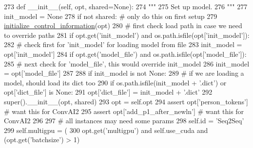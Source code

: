 \begin{DoxyCode}
273     \textcolor{keyword}{def }\_\_init\_\_(self, opt, shared=None):
274         \textcolor{stringliteral}{"""}
275 \textcolor{stringliteral}{        Set up model.}
276 \textcolor{stringliteral}{        """}
277         init\_model = \textcolor{keywordtype}{None}
278         \textcolor{keywordflow}{if} \textcolor{keywordflow}{not} shared:  \textcolor{comment}{# only do this on first setup}
279             \hyperlink{namespaceprojects_1_1controllable__dialogue_1_1controllable__seq2seq_1_1controls_aafbe257df1791349439cc63c99de8b5e}{initialize\_control\_information}(opt)
280             \textcolor{comment}{# first check load path in case we need to override paths}
281             \textcolor{keywordflow}{if} opt.get(\textcolor{stringliteral}{'init\_model'}) \textcolor{keywordflow}{and} os.path.isfile(opt[\textcolor{stringliteral}{'init\_model'}]):
282                 \textcolor{comment}{# check first for 'init\_model' for loading model from file}
283                 init\_model = opt[\textcolor{stringliteral}{'init\_model'}]
284             \textcolor{keywordflow}{if} opt.get(\textcolor{stringliteral}{'model\_file'}) \textcolor{keywordflow}{and} os.path.isfile(opt[\textcolor{stringliteral}{'model\_file'}]):
285                 \textcolor{comment}{# next check for 'model\_file', this would override init\_model}
286                 init\_model = opt[\textcolor{stringliteral}{'model\_file'}]
287 
288             \textcolor{keywordflow}{if} init\_model \textcolor{keywordflow}{is} \textcolor{keywordflow}{not} \textcolor{keywordtype}{None}:
289                 \textcolor{comment}{# if we are loading a model, should load its dict too}
290                 \textcolor{keywordflow}{if} os.path.isfile(init\_model + \textcolor{stringliteral}{'.dict'}) \textcolor{keywordflow}{or} opt[\textcolor{stringliteral}{'dict\_file'}] \textcolor{keywordflow}{is} \textcolor{keywordtype}{None}:
291                     opt[\textcolor{stringliteral}{'dict\_file'}] = init\_model + \textcolor{stringliteral}{'.dict'}
292         super().\_\_init\_\_(opt, shared)
293         opt = self.opt
294         \textcolor{keyword}{assert} opt[\textcolor{stringliteral}{'person\_tokens'}]  \textcolor{comment}{# want this for ConvAI2}
295         \textcolor{keyword}{assert} opt[\textcolor{stringliteral}{'add\_p1\_after\_newln'}]  \textcolor{comment}{# want this for ConvAI2}
296 
297         \textcolor{comment}{# all instances may need some params}
298         self.id = \textcolor{stringliteral}{'Seq2Seq'}
299         self.multigpu = (
300             opt.get(\textcolor{stringliteral}{'multigpu'}) \textcolor{keywordflow}{and} self.use\_cuda \textcolor{keywordflow}{and} (opt.get(\textcolor{stringliteral}{'batchsize'}) > 1)

\end{DoxyCode}

